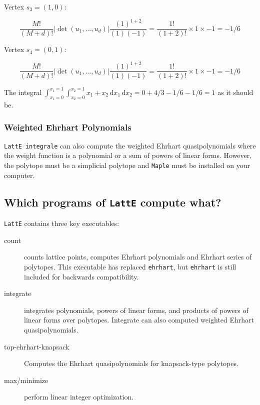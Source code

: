 \documentclass{article}
\newcommand{\latte}{{\tt LattE}\xspace}
\newcommand{\latteInt}{{\tt LattE integrale}\xspace}
\newcommand{\maple}{{\tt Maple}\xspace}
\renewcommand\d{\,\mathrm{d}}
\begin{document}
Vertex $s_3 = (1,0)$: 
        
\begin{displaymath}
 \frac{M!}{(M+d)!} |\det(u_1, \dots, u_d)| \frac{(1)^{1+2}}{(1)(-1)} = \frac{1!}{(1+2)!} \times 1 \times -1 = -1/6
\end{displaymath}


Vertex $s_4 = (0,1):$ 


\begin{displaymath}
 \frac{M!}{(M+d)!} |\det(u_1, \dots, u_d)| \frac{(1)^{1+2}}{(1)(-1)} = \frac{1!}{(1+2)!} \times 1 \times -1 = -1/6
\end{displaymath}

The integral $\int_{x_1 = 0}^{x_1 = 1}\int_{x_2 = 0}^{x_2 = 1} x_1 +x_2  \d{x_1}\d{x_2} = 0 + 4/3 -1/6 - 1/6 = 1$ as it should be.

\subsubsection{Weighted Ehrhart Polynomials}

\latteInt can also compute the weighted Ehrhart quasipolynomials where the weight function is a polynomial or a sum of powers of linear forms. However, the polytope must be a simplicial polytope and \maple must be installed on your computer.



\subsection{Which programs of {\tt LattE} compute what?}

\latte contains three key executables:
\begin{description}
        \item[count] counts lattice points, computes Ehrhart polynomials and Ehrhart series of polytopes. This executable has replaced {\tt ehrhart}, but {\tt ehrhart} is still included for backwards compatibility.
        \item[integrate] integrates polynomials, powers of linear forms, and products of powers of linear forms over polytopes. Integrate can also computed weighted Ehrhart quasipolynomials.
        \item[top-ehrhart-knapsack] Computes the Ehrhart quasipolynomials for knapsack-type polytopes.
        \item[max/minimize] perform linear integer optimization.
\end{description}
\end{document}

